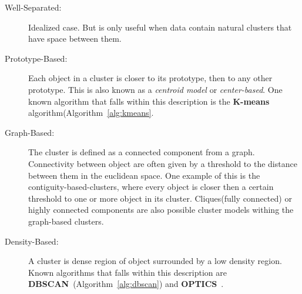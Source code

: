\begin{description}
	\item[Well-Separated:] Idealized case. But is only useful when data contain natural clusters that have space between them.
	\item[Prototype-Based:] Each object in a cluster is closer to its prototype, then to any other prototype. This is also known as a \textit{centroid model} or \textit{center-based}. One known algorithm that falls within this description is the \textbf{K-means} algorithm(Algorithm~\ref{alg:kmeans}.
	\item[Graph-Based:] The cluster is defined as a connected component from a graph. Connectivity between object are often given by a threshold to the distance between them in the euclidean space. One example of this is the contiguity-based-clusters, where every object is closer then a certain threshold to one or more object in its cluster. Cliques(fully connected) or highly connected components are also possible cluster models withing the graph-based clusters. 
	\item[Density-Based:] A cluster is dense region of object surrounded by a low density region. Known algorithms that falls within this description are \textbf{DBSCAN}~\cite{Ester96adensity-based}(Algorithm~\ref{alg:dbscan}) and \textbf{OPTICS}~\cite{Ankerst99optics:ordering}.
\end{description}

